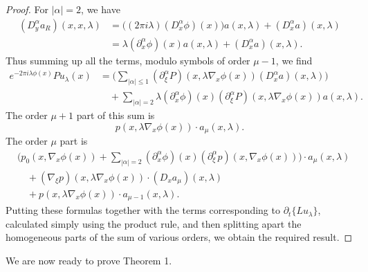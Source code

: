 \documentclass{article}
\theoremstyle{plain}
\theoremstyle{remark}
\theoremstyle{definition}
\begin{document}
\begin{proof}
	For $|\alpha| = 2$, we have
	\begin{align*}
		(D^\alpha_y a_R)(x,x,\lambda) &= \Big( (2 \pi i \lambda) (D^\alpha_x \phi)(x) \Big) a(x,\lambda) + (D^\alpha_x a)(x,\lambda)\\
		&= \lambda (\partial^\alpha_x \phi)(x) a(x,\lambda) + (D^\alpha_x a)(x,\lambda).
	\end{align*}
	Thus summing up all the terms, modulo symbols of order $\mu - 1$, we find
	\begin{align*}
		e^{-2 \pi i \lambda \phi(x)} Pu_\lambda(x) &= \Bigg( \sum_{|\alpha| \leq 1} (\partial_\xi^\alpha P)(x,\lambda \nabla_x \phi(x)) (D^\alpha_x a)(x,\lambda) \Bigg)\\
		&\quad + \sum_{|\alpha| = 2} \lambda (\partial^\alpha_x \phi)(x) (\partial_\xi^\alpha P)(x, \lambda \nabla_x \phi(x)) a(x,\lambda).
	\end{align*}
	The order $\mu + 1$ part of this sum is
	\[ p(x, \lambda \nabla_x \phi(x)) \cdot a_\mu(x,\lambda). \]
	The order $\mu$ part is
	\begin{align*}
		& \Big( p_0(x, \nabla_x \phi(x)) + \sum_{|\alpha| = 2} (\partial^\alpha_x \phi)(x) (\partial_\xi^\alpha p)(x, \nabla_x \phi(x)) \Big) \cdot a_\mu(x,\lambda)\\
		&\quad + (\nabla_\xi p)(x,\lambda \nabla_x \phi(x)) \cdot (D_x a_\mu)(x,\lambda) \\
		&\quad + p(x,\lambda \nabla_x \phi(x)) \cdot a_{\mu - 1}(x,\lambda).
	\end{align*}
	Putting these formulas together with the terms corresponding to $\partial_t \{ L u_\lambda \}$, calculated simply using the product rule, and then splitting apart the homogeneous parts of the sum of various orders, we obtain the required result.
\end{proof}

We are now ready to prove Theorem 1.
\end{document}

